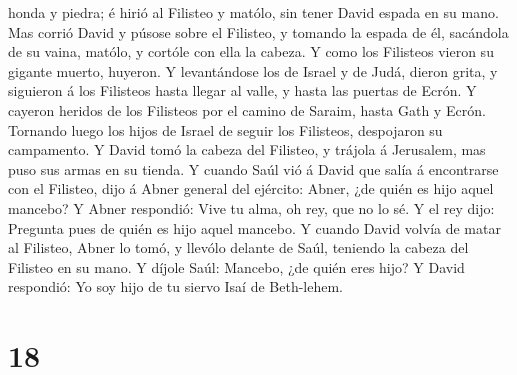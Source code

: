 honda y piedra; é hirió al Filisteo y matólo, sin tener David espada en
su mano.  Mas corrió David y púsose sobre el Filisteo, y
tomando la espada de él, sacándola de su vaina, matólo, y cortóle con
ella la cabeza. Y como los Filisteos vieron su gigante muerto, huyeron.
 Y levantándose los de Israel y de Judá, dieron grita, y
siguieron á los Filisteos hasta llegar al valle, y hasta las puertas de
Ecrón. Y cayeron heridos de los Filisteos por el camino de Saraim, hasta
Gath y Ecrón.  Tornando luego los hijos de Israel de seguir
los Filisteos, despojaron su campamento.  Y David tomó la
cabeza del Filisteo, y trájola á Jerusalem, mas puso sus armas en su
tienda.  Y cuando Saúl vió á David que salía á encontrarse
con el Filisteo, dijo á Abner general del ejército: Abner, ¿de quién es
hijo aquel mancebo? Y Abner respondió:  Vive tu alma, oh
rey, que no lo sé. Y el rey dijo: Pregunta pues de quién es hijo aquel
mancebo.  Y cuando David volvía de matar al Filisteo, Abner
lo tomó, y llevólo delante de Saúl, teniendo la cabeza del Filisteo en
su mano.  Y díjole Saúl: Mancebo, ¿de quién eres hijo? Y
David respondió: Yo soy hijo de tu siervo Isaí de Beth-lehem.

\hypertarget{section-17}{%
\section{18}\label{section-17}}

